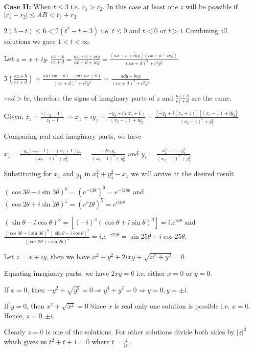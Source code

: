   {\bf Case II:} When $t \leq 3$ i.e. $r_1 > r_2$. In this case at least one $z$ will be possible if $|r_1 -
  r_2| \leq AB < r_1 + r_2$

  $2(3 - t)\leq 6 < 2(t^2 - t + 3)$ i.e. $t \leq 0$ and $t < 0$ or $t > 1$
  Combining all solutions we gace $1 < t < \infty$.
\item Let $z = x + iy$. $\frac{az + b}{cz + d} = \frac{ax + b + iay}{cx + d + icy} = \frac{(ax + b + iay)(cx
  + d - icy)}{(cx + d)^2 + c^2y^2}$

  $\Im\left(\frac{az + b}{cz + d}\right) = \frac{ay(cx + d) - cy(ax + b)}{(cx + d)^2 + c^2y^2} = \frac{ady -
  bcy}{(cx + d)^2 + c^2y^2}$

  $\because ad > bc$, therefore the signs of imaginary parts of $z$ and $\frac{az + b}{cz + d}$ are the same.
\item Given, $z_1 = \frac{i(z_2 + 1)}{z_2 - 1} \Rightarrow x_1 + iy_1 = \frac{-y_2 + i(x_2 + 1)}{(x_2 - 1) + iy_2}
  = \frac{[-y_2 + i(x_2 + 1)][(x_2 - 1) + iy_2]}{(x_2 - 1)^2 + y_2^2}$

  Comparing real and imaginary parts, we have

  $x_1 = \frac{-y_2(x_2 - 1) -(x_2 + 1)y_2}{(x_2 - 1)^2 + y_2^2} = \frac{-2x_2y_2}{(x_2 - 1)^2 + y_2^2}$ and $y_1 = \frac{x_2^2 - 1
    - y_2^2}{(x_2 - 1)^2 + y_2^2}$

  Substituting for $x_1$ and $y_1$ in $x_1^2 + y_1^2 - x_1$ we will arrive at the desired result.
\item $(\cos3\theta - i\sin3\theta)^6 = (e^{-i3\theta})^6 = e^{-i18\theta}$ and $(\cos2\theta +
  i\sin2\theta)^5 = (e^i2\theta)^5 = e^{i10\theta}$

  $(\sin\theta - i\cos\theta)^3 = [(-i)^3(\cos\theta + i\sin\theta)^3] = i.e^{i3\theta}$ and
  $\frac{(\cos3\theta - i\sin3\theta)^6(\sin\theta - i\cos\theta)^3}{(\cos2\theta + i\sin2\theta)^5} =
  i.e^{-i25\theta} = \sin25\theta + i\cos25\theta$.
\item Let $z = x + iy$, then we have $x^2 - y^2 + 2ixy + \sqrt{x^2 + y^2} = 0$

  Equating imaginary parts, we have $2xy = 0$ i.e. either $x = 0$ or $y = 0$.

  If $x = 0$, then $-y^2 + \sqrt{y^2} = 0 \Rightarrow y^4 + y^2 = 0 \Rightarrow y = 0, y = \pm i$.

  If $y = 0$, then $x^2 + \sqrt{x^2} = 0$ Since $x$ is real only one solution is possible i.e. $x = 0$.
  Hence, $z = 0, \pm i$.
\item Clearly $z = 0$ is one of the solutions. For other solutions divide both sides by $|z|^2$ which gives
  us $t^2 + t + 1 = 0$ where $t = \frac{z}{|z|}$.


